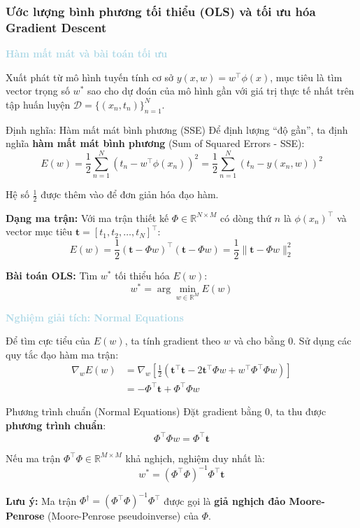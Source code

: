 \subsubsection{Ước lượng bình phương tối thiểu (OLS) và tối ưu hóa Gradient Descent}

\vspace{0.5em}
\noindent\textcolor{lightblue}{\textbf{Hàm mất mát và bài toán tối ưu}}
\vspace{0.5em}

Xuất phát từ mô hình tuyến tính cơ sở $y(x,w) = w^{\top}\phi(x)$, mục tiêu là tìm vector trọng số $w^*$ sao cho dự đoán của mô hình gần với giá trị thực tế nhất trên tập huấn luyện $\mathcal{D} = \{(x_n, t_n)\}_{n=1}^{N}$.

\begin{infobox}{Định nghĩa: Hàm mất mát bình phương (SSE)}
Để định lượng ``độ gần'', ta định nghĩa \textbf{hàm mất mát bình phương} (Sum of Squared Errors - SSE):
$$E(w) = \frac{1}{2}\sum_{n=1}^{N}\left(t_n - w^{\top}\phi(x_n)\right)^2 = \frac{1}{2}\sum_{n=1}^{N}\left(t_n - y(x_n,w)\right)^2$$

Hệ số $\frac{1}{2}$ được thêm vào để đơn giản hóa đạo hàm. 

\textbf{Dạng ma trận:} Với ma trận thiết kế $\Phi \in \mathbb{R}^{N \times M}$ có dòng thứ $n$ là $\phi(x_n)^{\top}$ và vector mục tiêu $\mathbf{t} = [t_1, t_2, \ldots, t_N]^{\top}$:
$$E(w) = \frac{1}{2}(\mathbf{t} - \Phi w)^{\top}(\mathbf{t} - \Phi w) = \frac{1}{2}\|\mathbf{t} - \Phi w\|_2^2$$

\textbf{Bài toán OLS:} Tìm $w^*$ tối thiểu hóa $E(w)$:
$$w^* = \arg\min_{w \in \mathbb{R}^M} E(w)$$
\end{infobox}

\vspace{0.5em}
\noindent\textcolor{lightblue}{\textbf{Nghiệm giải tích: Normal Equations}}
\vspace{0.5em}

Để tìm cực tiểu của $E(w)$, ta tính gradient theo $w$ và cho bằng 0. Sử dụng các quy tắc đạo hàm ma trận:
\begin{align*}
\nabla_w E(w) &= \nabla_w \left[\frac{1}{2}(\mathbf{t}^{\top}\mathbf{t} - 2\mathbf{t}^{\top}\Phi w + w^{\top}\Phi^{\top}\Phi w)\right] \\
&= -\Phi^{\top}\mathbf{t} + \Phi^{\top}\Phi w
\end{align*}

\begin{importantbox}{Phương trình chuẩn (Normal Equations)}
Đặt gradient bằng 0, ta thu được \textbf{phương trình chuẩn}:
$$\Phi^{\top}\Phi w = \Phi^{\top}\mathbf{t}$$

Nếu ma trận $\Phi^{\top}\Phi \in \mathbb{R}^{M \times M}$ khả nghịch, nghiệm duy nhất là:
$$w^* = (\Phi^{\top}\Phi)^{-1}\Phi^{\top}\mathbf{t}$$

\textbf{Lưu ý:} Ma trận $\Phi^{\dagger} = (\Phi^{\top}\Phi)^{-1}\Phi^{\top}$ được gọi là \textbf{giả nghịch đảo Moore-Penrose} (Moore-Penrose pseudoinverse) của $\Phi$.
\end{importantbox}

